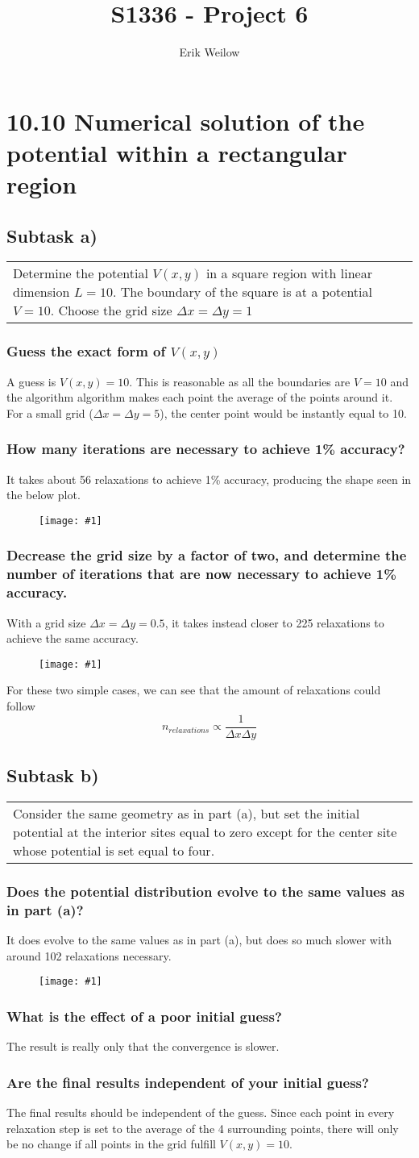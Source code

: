 \documentclass[11pt]{article}
\title{S1336 - Project 6}
\author{Erik Weilow}
\newcommand{\singlefigure}[1]{
\begin{figure}[H]
  \centering
  \begin{minipage}{0.4\textwidth}
    \centering
    \texttt{[image: \#1]}
  \end{minipage}
\end{figure}
}
\newcommand{\task}[2]{
  \subsection*{Subtask #1)}
  \begin{tabular}{|p{0.9\textwidth}}
    #2\\
  \end{tabular}
}
\newcommand{\subtask}[1]{
  \subsubsection*{#1}
}
\begin{document}
\maketitle
\newpage

\section*{10.10 Numerical solution of the potential within a rectangular region}
\task{a}{
  Determine the potential $V(x, y)$ in a square region with linear dimension $L = 10$. 
  The boundary of the square is at a potential $V = 10$. 
  Choose the grid size $\Delta x = \Delta y = 1$
}
\subtask{Guess the exact form of $V(x, y)$}
A guess is $V(x,y) = 10$. This is reasonable as all the boundaries are $V=10$ and the algorithm algorithm makes each point the average of the points around it.
For a small grid ($\Delta x = \Delta y = 5$), the center point would be instantly equal to 10.

\subtask{How many iterations are necessary to achieve 1\% accuracy?}
It takes about 56 relaxations to achieve 1\% accuracy, producing the shape seen in the below plot.
\singlefigure{./plots/1010/a_1.png}

\subtask{Decrease the grid size by a factor of two, and determine the number of iterations that are now necessary to achieve 1\% accuracy.}
With a grid size $\Delta x = \Delta y = 0.5$, it takes instead closer to 225 relaxations to achieve the same accuracy. 
\singlefigure{./plots/1010/a_2.png}
For these two simple cases, we can see that the amount of relaxations could follow
$$
n_{relaxations} \propto \frac{1}{\Delta x \Delta y}
$$

\task{b}{
  Consider the same geometry as in part (a), but set the initial potential at the interior sites
  equal to zero except for the center site whose potential is set equal to four.
}
\subtask{Does the potential distribution evolve to the same values as in part (a)?}
It does evolve to the same values as in part (a), but does so much slower with around 102 relaxations necessary.
\singlefigure{./plots/1010/b_1.png}

\subtask{What is the effect of a poor initial guess?}
The result is really only that the convergence is slower.

\subtask{Are the final results independent of your initial guess?}
The final results should be independent of the guess. Since each point in every relaxation step is set to the average of the 4 surrounding points, there will only be no change if all points in the grid fulfill $V(x,y) = 10$.
\end{document}
